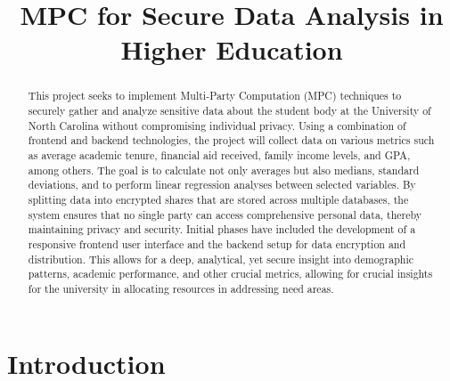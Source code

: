 \documentclass[conference]{IEEEtran}
\begin{document}
\title{MPC for Secure Data Analysis in Higher Education}


\author{
\and
{}
\and
{}
\and
{}
\and
{}
}

\maketitle

\begin{abstract}

This project seeks to implement Multi-Party Computation (MPC) techniques to securely gather and analyze sensitive data about the student body at the University of North Carolina without compromising individual privacy.
Using a combination of frontend and backend technologies, the project will collect data on various metrics such as average academic tenure, financial aid received, family income levels, and GPA, among others. 
The goal is to calculate not only averages but also medians, standard deviations, and to perform linear regression analyses between selected variables. 
By splitting data into encrypted shares that are stored across multiple databases, the system ensures that no single party can access comprehensive personal data, thereby maintaining privacy and security. 
Initial phases have included the development of a responsive frontend user interface and the backend setup for data encryption and distribution. 
This allows for a deep, analytical, yet secure insight into demographic patterns, academic performance, and other crucial metrics, allowing for crucial insights for the university in allocating resources in addressing need areas. 

\end{abstract}


\section{Introduction}


\end{document}
